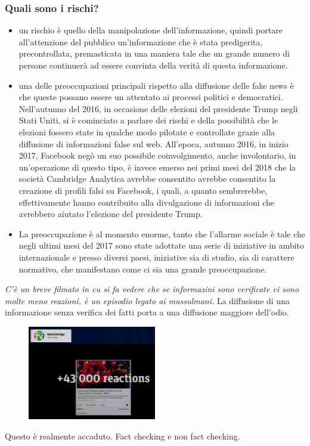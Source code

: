 \subsubsection{Quali sono i rischi?}
\begin{itemize}
    \item un rischio è quello della manipolazione dell'informazione, quindi portare all'attenzione del pubblico un'informazione che è stata predigerita, precontrollata, premasticata in una maniera tale che un grande numero di persone continuerà ad essere convinta della verità di questa informazione.
    \item una delle preoccupazioni principali rispetto alla diffusione delle fake news è che queste possano essere un attentato ai processi politici e democratici. Nell'autunno del 2016, in occasione delle elezioni del presidente Trump negli Stati Uniti, si è cominciato a parlare dei rischi e della possibilità che le elezioni fossero state in qualche modo pilotate e controllate grazie alla diffusione di informazioni false sul web. All'epoca, autunno 2016, in inizio 2017, Facebook negò un suo possibile coinvolgimento, anche involontario, in un'operazione di questo tipo, è invece emerso nei primi mesi del 2018 che la società Cambridge Analytica avrebbe consentito avrebbe consentito la creazione di profili falsi su Facebook, i quali, a quanto sembrerebbe, effettivamente hanno contribuito alla divulgazione di informazioni che avrebbero aiutato l'elezione del presidente Trump.
    \item  La preoccupazione è al momento enorme, tanto che l'allarme sociale è tale che negli ultimi mesi del 2017 sono state adottate una serie di iniziative in ambito internazionale e presso diversi paesi, iniziative sia di studio, sia  di carattere normativo, che manifestano come ci sia una grande preoccupazione.
\end{itemize}

\textit{C'è un breve filmato in cu si fa vedere che se informazini sono verificate ci sono molte meno reazioni, è un episodio legato ai mussulmani.}
La diffusione di una informazione senza verifica dei fatti porta a una diffusione maggiore dell'odio. 
\begin{figure}[h]
    \centering
    \includegraphics[width=0.5\textwidth]{images/10_lez_fig_02}
\end{figure}
Questo è realmente accaduto. Fact checking e non fact checking. 

